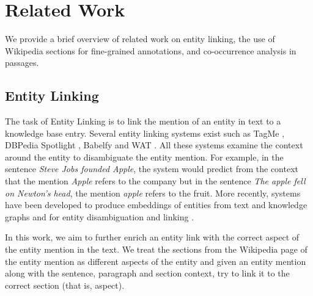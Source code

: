 
\section{Related Work}
\label{sec:Related Work}
We provide a brief overview of related work on entity linking, the use of Wikipedia sections for fine-grained annotations, and co-occurrence analysis in passages.

\subsection{Entity Linking}
The task of Entity Linking is to link the mention of an entity in text to a knowledge base entry. Several entity linking systems exist such as TagMe \cite{ferragina2010tagme}, DBPedia Spotlight \cite{mendes2011dbpedia}, Babelfy \cite{babelfy} and WAT \cite{piccinno2014wat}. All these systems examine the context around the entity to disambiguate the entity mention. 
For example, in the sentence \textit{Steve Jobs founded Apple}, the system would predict from the context that the mention \textit{Apple} refers to the company but in the sentence \textit{The apple fell on Newton's head}, the mention \textit{apple} refers to the fruit. 
More recently, systems have been developed to produce embeddings of entities from text and knowledge graphs \cite{huang2015leveraging,ristoski2016rdf2vec,yamada2016joint} and for entity disambiguation and linking \cite{yamada2017learning}. 

In this work, we aim to further enrich an entity link with the correct aspect of the entity mention in the text. We treat the sections from the Wikipedia page of the entity mention as different aspects of the entity and given an entity mention along with the sentence, paragraph and section context, try to link it to the correct section (that is, aspect).




